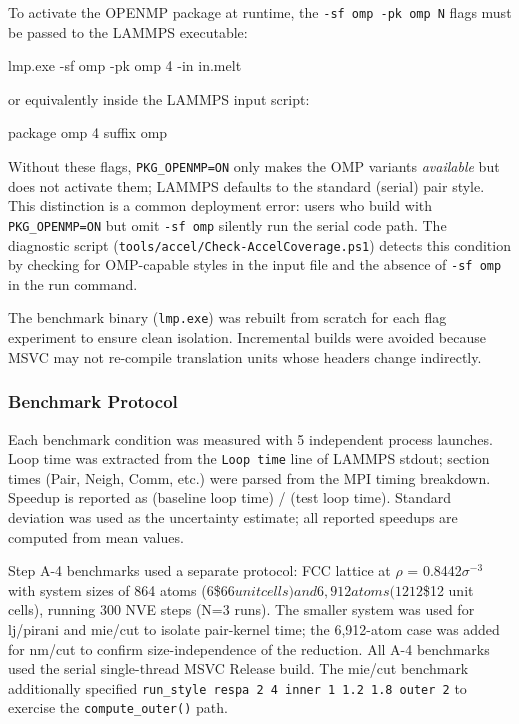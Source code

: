 \documentclass[
  11pt,
]{article}
\newenvironment{Shaded}{}{}
\newcommand{\AttributeTok}[1]{\textcolor[rgb]{0.49,0.56,0.16}{#1}}
\newcommand{\ExtensionTok}[1]{#1}
\newcommand{\NormalTok}[1]{#1}
\begin{document}
To activate the OPENMP package at runtime, the
\texttt{-sf\ omp\ -pk\ omp\ N} flags must be passed to the LAMMPS
executable:

\begin{Shaded}
\begin{Highlighting}[]
\ExtensionTok{lmp.exe} \AttributeTok{{-}sf}\NormalTok{ omp }\AttributeTok{{-}pk}\NormalTok{ omp 4 }\AttributeTok{{-}in}\NormalTok{ in.melt}
\end{Highlighting}
\end{Shaded}

or equivalently inside the LAMMPS input script:

\begin{Shaded}
\begin{Highlighting}[]
\NormalTok{package omp 4}
\NormalTok{suffix omp}
\end{Highlighting}
\end{Shaded}

Without these flags, \texttt{PKG\_OPENMP=ON} only makes the OMP variants
\emph{available} but does not activate them; LAMMPS defaults to the
standard (serial) pair style. This distinction is a common deployment
error: users who build with \texttt{PKG\_OPENMP=ON} but omit
\texttt{-sf\ omp} silently run the serial code path. The diagnostic
script (\texttt{tools/accel/Check-AccelCoverage.ps1}) detects this
condition by checking for OMP-capable styles in the input file and the
absence of \texttt{-sf\ omp} in the run command.

The benchmark binary (\texttt{lmp.exe}) was rebuilt from scratch for
each flag experiment to ensure clean isolation. Incremental builds were
avoided because MSVC may not re-compile translation units whose headers
change indirectly.

\subsubsection{Benchmark Protocol}\label{benchmark-protocol}

Each benchmark condition was measured with 5 independent process
launches. Loop time was extracted from the \texttt{Loop\ time} line of
LAMMPS stdout; section times (Pair, Neigh, Comm, etc.) were parsed from
the MPI timing breakdown. Speedup is reported as (baseline loop time) /
(test loop time). Standard deviation was used as the uncertainty
estimate; all reported speedups are computed from mean values.

Step A-4 benchmarks used a separate protocol: FCC lattice at \(\rho\) =
0.8442\(\sigma\)\(^{-3}\) with system sizes of 864 atoms
(6\$\times\(6\)\times\(6 unit cells) and 6,912 atoms (12\)\times\(12\)\times\$12
unit cells), running 300 NVE steps (N=3 runs). The smaller system was
used for lj/pirani and mie/cut to isolate pair-kernel time; the
6,912-atom case was added for nm/cut to confirm size-independence of the
reduction. All A-4 benchmarks used the serial single-thread MSVC Release
build. The mie/cut benchmark additionally specified
\texttt{run\_style\ respa\ 2\ 4\ inner\ 1\ 1.2\ 1.8\ outer\ 2} to
exercise the \texttt{compute\_outer()} path.
\end{document}
